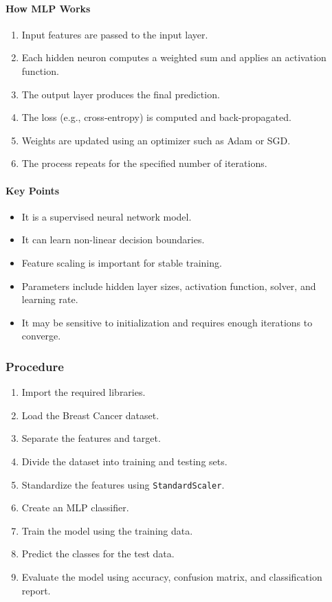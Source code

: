 \documentclass[a4paper,11pt]{article}
\begin{document}
\begin{itemize}
\paragraph{How MLP Works}
\begin{enumerate}
    \item Input features are passed to the input layer.
    \item Each hidden neuron computes a weighted sum and applies an activation function.
    \item The output layer produces the final prediction.
    \item The loss (e.g., cross-entropy) is computed and back-propagated.
    \item Weights are updated using an optimizer such as Adam or SGD.
    \item The process repeats for the specified number of iterations.
\end{enumerate}

\paragraph{Key Points}
\begin{itemize}
    \item It is a supervised neural network model.
    \item It can learn non-linear decision boundaries.
    \item Feature scaling is important for stable training.
    \item Parameters include hidden layer sizes, activation function, solver, and learning rate.
    \item It may be sensitive to initialization and requires enough iterations to converge.
\end{itemize}

\subsubsection{Procedure}
\begin{enumerate}
    \item Import the required libraries.
    \item Load the Breast Cancer dataset.
    \item Separate the features and target.
    \item Divide the dataset into training and testing sets.
    \item Standardize the features using \texttt{StandardScaler}.
    \item Create an MLP classifier.
    \item Train the model using the training data.
    \item Predict the classes for the test data.
    \item Evaluate the model using accuracy, confusion matrix, and classification report.
\end{enumerate}


\end{itemize}
\end{document}
